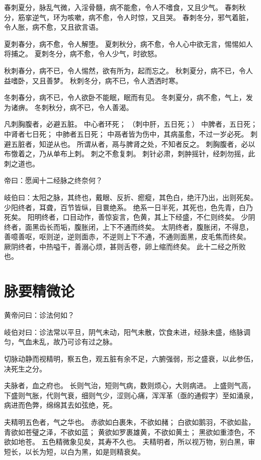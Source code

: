 \documentclass{article}%
\begin{document}
春刺夏分，脉乱气微，入淫骨髓，病不能愈，令人不嗜食，又且少气。
春刺秋分，筋挛逆气，环为咳嗽，病不愈，令人时惊，又且哭。
春刺冬分，邪气着脏，令人胀，病不愈，又且欲言语。

夏刺春分，病不愈，令人解堕。
夏刺秋分，病不愈，令人心中欲无言，惕惕如人将捕之。
夏刺冬分，病不愈，令人少气，时欲怒。

秋刺春分，病不已，令人惕然，欲有所为，起而忘之。
秋刺夏分，病不已，令人益嗜卧，又且善梦。
秋刺冬分，病不已，令人洒洒时寒。

冬刺春分，病不已，令人欲卧不能眠，眠而有见。
冬刺夏分，病不愈，气上，发为诸痹。
冬刺秋分，病不已，令人善渴。

凡刺胸腹者，必避五脏。
中心者环死；
（刺中肝，五日死；）
中脾者，五日死；
中肾者七日死；
中肺者五日死；
中鬲者皆为伤中，其病虽愈，不过一岁必死。
刺避五脏者，知逆从也。
所谓从者，鬲与脾肾之处，不知者反之。
刺胸腹者，必以布憿着之，乃从单布上刺。
刺之不愈复刺。
刺针必肃，刺肿摇针，经刺勿摇，此刺之道也。


帝曰：愿闻十二经脉之终奈何？

岐伯曰：太阳之脉，其终也，戴眼、反折、瘛瘲，其色白，绝汗乃出，出则死矣。
少阳终者，耳聋，百节皆纵，目睘绝系。
绝系一日半死，其死也，色先青，白乃死矣。
阳明终者，口目动作，善惊妄言，色黄，其上下经盛，不仁则终矣。
少阴终者，面黑齿长而垢，腹胀闭，上下不通而终矣。
太阴终者，腹胀闭，不得息，善噫善呕，呕则逆，逆则面赤，不逆则上下不通，不通则面黑，皮毛焦而终矣。
厥阴终者，中热嗌干，善溺心烦，甚则舌卷，卵上缩而终矣。
此十二经之所败也。


\section{脉要精微论}

黄帝问曰：诊法何如？

岐伯对曰：诊法常以平旦，阴气未动，阳气未散，饮食未进，经脉未盛，络脉调匀，气血未乱，故乃可诊有过之脉。

切脉动静而视精明，察五色，观五脏有余不足，六腑强弱，形之盛衰，以此参伍，决死生之分。

夫脉者，血之府也。
长则气治，短则气病，数则烦心，大则病进。
上盛则气高，下盛则气胀，代则气衰，细则气少，涩则心痛，浑浑革（亟的通假字）至如涌泉，病进而色弊，绵绵其去如弦绝，死。

夫精明五色者，气之华也。
赤欲如白裹朱，不欲如赭；
白欲如鹅羽，不欲如盐，
青欲如苍璧之泽，不欲如蓝；
黄欲如罗裹雄黄，不欲如黄土；
黑欲如重漆色，不欲如地苍。
五色精微象见矣，其寿不久也。
夫精明者，所以视万物，别白黑，审短长，以长为短，以白为黑，如是则精衰矣。
\end{document}
